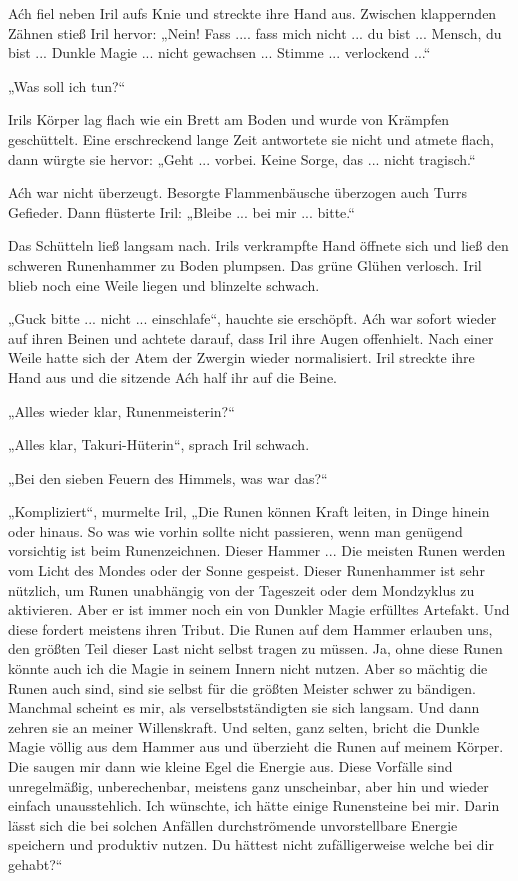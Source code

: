 Aćh fiel neben Iril aufs Knie und streckte ihre Hand aus. Zwischen klappernden Zähnen stieß Iril hervor: „Nein! Fass .... fass mich nicht ... du bist ... Mensch, du bist ... Dunkle Magie ... nicht gewachsen ... Stimme ... verlockend ...“

„Was soll ich tun?“

Irils Körper lag flach wie ein Brett am Boden und wurde von Krämpfen geschüttelt. Eine erschreckend lange Zeit antwortete sie nicht und atmete flach, dann würgte sie hervor: „Geht ... vorbei. Keine Sorge, das ... nicht tragisch.“

Aćh war nicht überzeugt. Besorgte Flammenbäusche überzogen auch Turrs Gefieder. Dann flüsterte Iril: „Bleibe ... bei mir ... bitte.“

Das Schütteln ließ langsam nach. Irils verkrampfte Hand öffnete sich und ließ den schweren Runenhammer zu Boden plumpsen. Das grüne Glühen verlosch. Iril blieb noch eine Weile liegen und blinzelte schwach.

„Guck bitte ... nicht ... einschlafe“, hauchte sie erschöpft. Aćh war sofort wieder auf ihren Beinen und achtete darauf, dass Iril ihre Augen offenhielt. Nach einer Weile hatte sich der Atem der Zwergin wieder normalisiert. Iril streckte ihre Hand aus und die sitzende Aćh half ihr auf die Beine.

„Alles wieder klar, Runenmeisterin?“

„Alles klar, Takuri-Hüterin“, sprach Iril schwach.

„Bei den sieben Feuern des Himmels, was war das?“

„Kompliziert“, murmelte Iril, „Die Runen können Kraft leiten, in Dinge hinein oder hinaus. So was wie vorhin sollte nicht passieren, wenn man genügend vorsichtig ist beim Runenzeichnen. Dieser Hammer ... Die meisten Runen werden vom Licht des Mondes oder der Sonne gespeist. Dieser Runenhammer ist sehr nützlich, um Runen unabhängig von der Tageszeit oder dem Mondzyklus zu aktivieren. Aber er ist immer noch ein von Dunkler Magie erfülltes Artefakt. Und diese fordert meistens ihren Tribut. Die Runen auf dem Hammer erlauben uns, den größten Teil dieser Last nicht selbst tragen zu müssen. Ja, ohne diese Runen könnte auch ich die Magie in seinem Innern nicht nutzen. Aber so mächtig die Runen auch sind, sind sie selbst für die größten Meister schwer zu bändigen. Manchmal scheint es mir, als verselbstständigten sie sich langsam. Und dann zehren sie an meiner Willenskraft. Und selten, ganz selten, bricht die Dunkle Magie völlig aus dem Hammer aus und überzieht die Runen auf meinem Körper. Die saugen mir dann wie kleine Egel die Energie aus. Diese Vorfälle sind unregelmäßig, unberechenbar, meistens ganz unscheinbar, aber hin und wieder einfach unausstehlich. Ich wünschte, ich hätte einige Runensteine bei mir. Darin lässt sich die bei solchen Anfällen durchströmende unvorstellbare Energie speichern und produktiv nutzen. Du hättest nicht zufälligerweise welche bei dir gehabt?“

